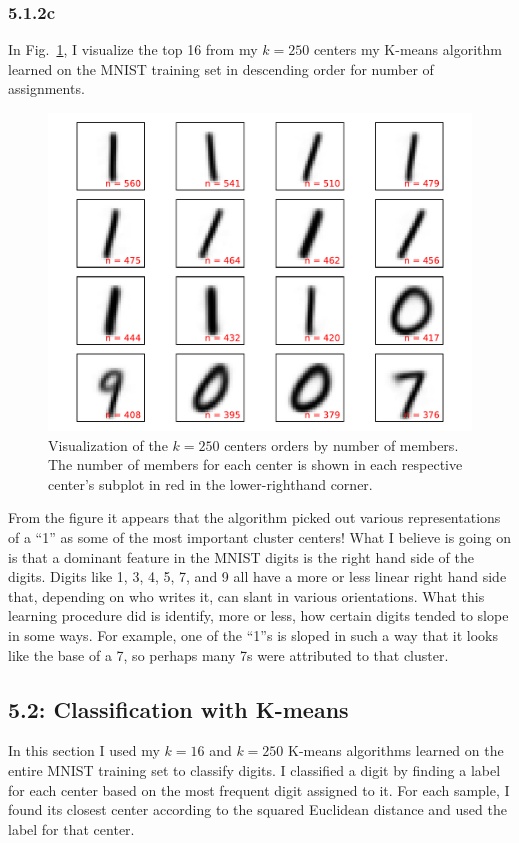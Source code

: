 \documentclass[12pt]{amsart}
\begin{document}
\subsubsection*{5.1.2c}
In Fig.~\ref{fig:k_250_means}, I visualize the top 16 from my $k = 250$ centers my K-means algorithm learned on the MNIST training set in descending order for number of assignments.
\begin{figure}[H]
	\includegraphics[width=\columnwidth]{k_250_means.pdf}
    \caption{Visualization of the $k = 250$ centers orders by number of members.  The number of members for each center is shown in each respective center's subplot in red in the lower-righthand corner.}
    \label{fig:k_250_means}
\end{figure}
From the figure it appears that the algorithm picked out various representations of a ``1'' as some of the most important cluster centers!  What I believe is going on is that a dominant feature in the MNIST digits is the right hand side of the digits.  Digits like 1, 3, 4, 5, 7, and 9 all have a more or less linear right hand side that, depending on who writes it, can slant in various orientations.  What this learning procedure did is identify, more or less, how certain digits tended to slope in some ways.  For example, one of the ``1''s is sloped in such a way that it looks like the base of a 7, so perhaps many 7s were attributed to that cluster.

\subsection*{5.2: Classification with K-means}
In this section I used my $k = 16$ and $k = 250$ K-means algorithms learned on the entire MNIST training set to classify digits.  I classified a digit by finding a label for each center based on the most frequent digit assigned to it.  For each sample, I found its closest center according to the squared Euclidean distance and used the label for that center.
\end{document}
